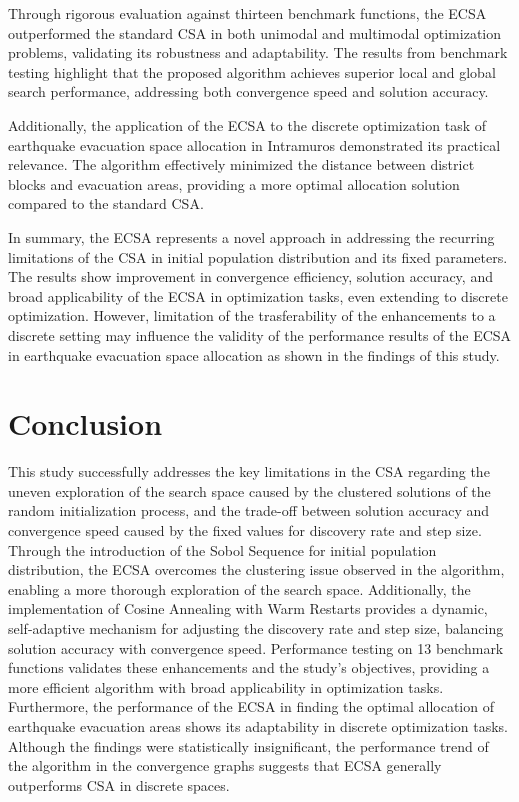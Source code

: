 \documentclass{article}
\begin{document}
Through rigorous evaluation against thirteen benchmark functions, the ECSA outperformed the standard CSA in both unimodal and multimodal optimization problems, validating its robustness and adaptability. The results from benchmark testing highlight that the proposed algorithm achieves superior local and global search performance, addressing both convergence speed and solution accuracy.

Additionally, the application of the ECSA to the discrete optimization task of earthquake evacuation space allocation in Intramuros demonstrated its practical relevance. The algorithm effectively minimized the distance between district blocks and evacuation areas, providing a more optimal allocation solution compared to the standard CSA.

In summary, the ECSA represents a novel approach in addressing the recurring limitations of the CSA in initial population distribution and its fixed parameters. The results show improvement in convergence efficiency, solution accuracy, and broad applicability of the ECSA in optimization tasks, even extending to discrete optimization. However, limitation of the trasferability of the enhancements to a discrete setting may influence the validity of the performance results of the ECSA in earthquake evacuation space allocation as shown in the findings of this study.

\section{Conclusion}
This study successfully addresses the key limitations in the CSA regarding the uneven exploration of the search space caused by the clustered solutions of the random initialization process, and the trade-off between solution accuracy and convergence speed caused by the fixed values for discovery rate and step size. Through the introduction of the Sobol Sequence for initial population distribution, the ECSA overcomes the clustering issue observed in the algorithm, enabling a more thorough exploration of the search space. Additionally, the implementation of Cosine Annealing with Warm Restarts provides a dynamic, self-adaptive mechanism for adjusting the discovery rate and step size, balancing solution accuracy with convergence speed. Performance testing on 13 benchmark functions validates these enhancements and the study’s objectives, providing a more efficient algorithm with broad applicability in optimization tasks. Furthermore, the performance of the ECSA in finding the optimal allocation of earthquake evacuation areas shows its adaptability in discrete optimization tasks. Although the findings were statistically insignificant, the performance trend of the algorithm in the convergence graphs suggests that ECSA generally outperforms CSA in discrete spaces.
\end{document}
